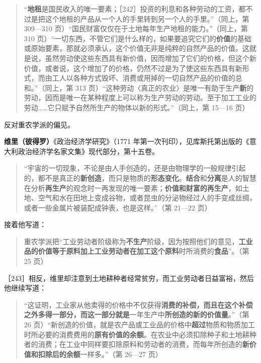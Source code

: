 \begin{quote}“\textbf{地租}是国民收入的唯一要素；［242］投资的利息和各种劳动的工资，都不过是把这个地租的产品从一个人的手里转到另一个人的手里。”（同上，第 309—310 页）“国民财富仅仅在于土地每年生产地租的能力。”（同上，第 310 页）“一切东西，不管它们是什么样的，如果要追究它们的\textbf{价值}的基础或原始要素，那就必须承认，这个价值无非是纯粹的自然产品的价值。这就是说，虽然劳动使这些东西具有新价值，因而增加了它们的价格，但这个新价值，或者说，这个增加了的价格，仍然不过是为了使这些东西具有新形式，而由工人以各种方式毁坏、消费或用掉的一切自然产品的价值的总和。”（同上，第 313 页）“这种劳动〈真正的农业〉是唯一有助于生产\textbf{新}的劳动，因而是唯一在某种程度上可以称为生产劳动的劳动。至于加工工业的劳动……它只赋予自然所生产的物体以新的形式。”（同上，第 15—16 页）\end{quote}


反对重农学派的偏见。

\textbf{维里（彼得罗）}《政治经济学研究》（1771 年第一次刊印），见库斯托第出版的《意大利政治经济学名家文集》现代部分，第十五卷。

\begin{quote}“宇宙的一切现象，不论是由人手创造的，还是由物理学的一般规律引起的，都不是真正的\textbf{新创造}，而只是物质的\textbf{形态变化}。\textbf{结合}和\textbf{分离}是人的智慧在分析\textbf{再生产}的观念时一再发现的唯一要素；\textbf{价值和财富的再生产}，如土地、空气和水在田地上变成谷物，或者昆虫的分泌物经过人的手变成丝绸，或者一些金属片被装配成钟表，也是这样。”（第 21—22 页）\end{quote}

接着他写道：

\begin{quote}重农学派把“工业劳动者阶级称为\textbf{不生产}阶级，因为按照他们的意见，\textbf{工业品的价值等于原料加上工业劳动者在加工这个原料}时所消费的\textbf{食品}”。（第 25 页）\end{quote}

［243］相反，维里却注意到土地耕种者经常贫穷，而工业劳动者日益富裕，然后他继续写道：

\begin{quote}“这证明，工业家从他卖得的价格中不仅获得\textbf{消费的补偿，而且在这个补偿之外多得一部分，而这一部分就是}一年生产中\textbf{所创造的新的价值量}。”（第 26 页）“新创造的价值，就是农产品或工业品的价格中\textbf{超过}物质和物质加工时所必要的消费费用的\textbf{原有价值的余额}。在农业中必须扣除种子和土地耕种者的消费；在工业中同样要扣除原料和劳动者的消费，而每年所创造的\textbf{新价值和扣除后的余额}一样多。”（第 26—27 页）\end{quote}

